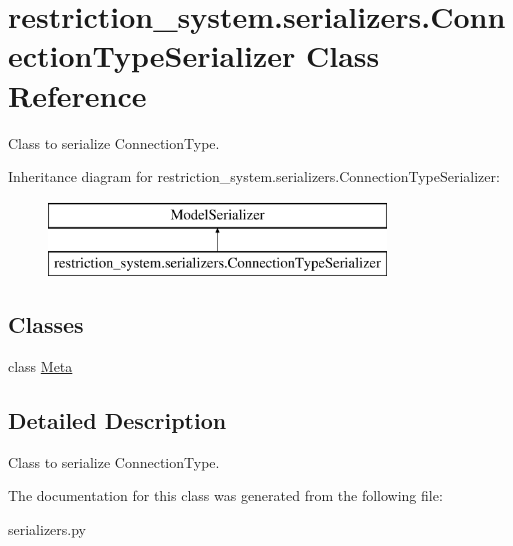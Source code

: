 \hypertarget{classrestriction__system_1_1serializers_1_1ConnectionTypeSerializer}{}\section{restriction\+\_\+system.\+serializers.\+Connection\+Type\+Serializer Class Reference}
\label{classrestriction__system_1_1serializers_1_1ConnectionTypeSerializer}


Class to serialize Connection\+Type.  


Inheritance diagram for restriction\+\_\+system.\+serializers.\+Connection\+Type\+Serializer\+:\begin{figure}[H]
\begin{center}
\leavevmode
\includegraphics[height=2.000000cm]{classrestriction__system_1_1serializers_1_1ConnectionTypeSerializer}
\end{center}
\end{figure}
\subsection*{Classes}
\begin{DoxyCompactItemize}
\item 
class \hyperlink{classrestriction__system_1_1serializers_1_1ConnectionTypeSerializer_1_1Meta}{Meta}
\end{DoxyCompactItemize}


\subsection{Detailed Description}
Class to serialize Connection\+Type. 

The documentation for this class was generated from the following file\+:\begin{DoxyCompactItemize}
\item 
serializers.\+py\end{DoxyCompactItemize}

